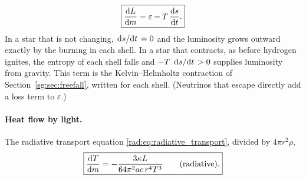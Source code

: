 \begin{equation}
	\boxed{\dv{L}{m}=\varepsilon-T\,\dv{s}{t}.}
	\label{st:eq:energy}
\end{equation}
In a star that is not changing, $\dv*{s}{t}=0$ and the luminosity grows outward exactly by the burning in each shell. In a star that contracts, as before hydrogen ignites, the entropy of each shell falls and $-T\,\dv*{s}{t}>0$ supplies luminosity from gravity. This term is the Kelvin–Helmholtz contraction of Section~\ref{sg:sec:freefall}, written for each shell. (Neutrinos that escape directly add a loss term to $\varepsilon$.)

\paragraph{Heat flow by light.} The radiative transport equation \eqref{rad:eq:radiative_transport}, divided by $4\pi r^2\rho$,
\begin{equation}
	\boxed{\dv{T}{m}=-\frac{3\kappa L}{64\pi^2ac\,r^4T^3}\qquad\text{(radiative).}}
	\label{st:eq:radiative}
\end{equation}

